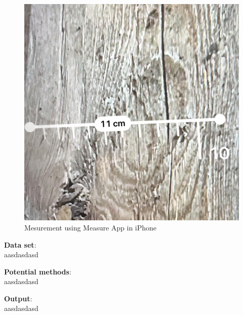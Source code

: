 \begin{figure}[ht]
  \centering
   \includegraphics[width=.5\textwidth]{Master Thesis/Images/Section_3/3_iphone_measure.jpg}
  \caption{Mesurement using Measure App in iPhone}   
  \label{fig:iphone_mea}
\end{figure}  


\hspace*{\fill}

\textbf{Data set}:\\

aasdasdasd


\hspace*{\fill}

\textbf{Potential methods}:\\

aasdasdasd


\hspace*{\fill}

\textbf{Output}:\\

aasdasdasd

